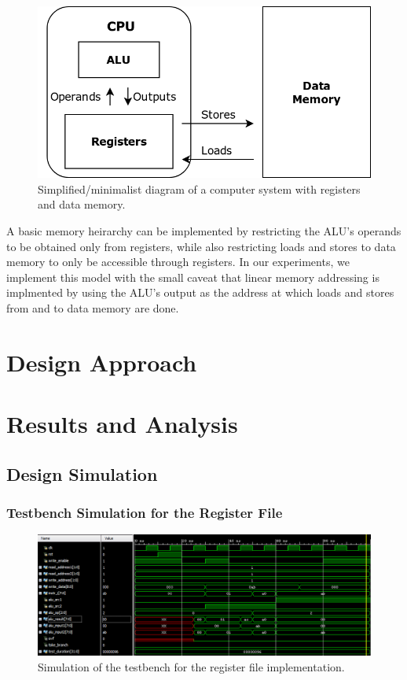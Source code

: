\documentclass[12pt, letterpaper]{article}
\begin{document}
\begin{figure}[h]
\centering
\includegraphics[width=.7\linewidth]{images/simple-stateful-cpu.png}
\caption{Simplified/minimalist diagram of a computer system with registers and data memory.}
\end{figure}

A basic memory heirarchy can be implemented by restricting the ALU's operands to be obtained only from registers, while also restricting loads and stores to data memory to only be accessible through registers.  In our experiments, we implement this model with the small caveat that linear memory addressing is implmented by using the ALU's output as the address at which loads and stores from and to data memory are done.



\newpage
\section{Design Approach}




\newpage
\section{Results and Analysis}

\subsection{Design Simulation}

\subsubsection{Testbench Simulation for the Register File}
\begin{figure}[h]
\includegraphics[width=\linewidth]{images/lab4-results-1.png}
\caption{Simulation of the testbench for the register file implementation.}
\end{figure}
\end{document}
